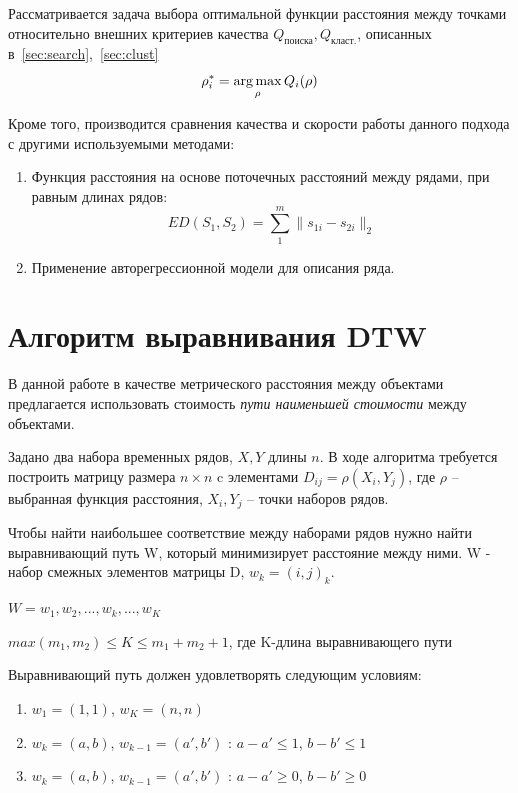 \documentclass[12pt,twoside]{article}
\begin{document}
        Рассматривается задача выбора оптимальной функции расстояния  между точками относительно внешних критериев качества $Q_\text{поиска}, Q_\text{класт.}$, описанных в~\ref{sec:search},~\ref{sec:clust}
        $$\rho_i^* = \argmax_\rho Q_i(\rho)$$
    
        
        Кроме того, производится сравнения качества и скорости работы данного подхода с другими используемыми методами:
        \begin{enumerate}[label=\arabic*)]
            \item Функция расстояния на основе поточечных расстояний между рядами, при равным длинах рядов:
                $$
                    ED(S_1, S_2) = \sum\limits_1^m \|s_{1i} - s_{2i}\|_2
                $$

            \item Применение авторегрессионной модели для описания ряда.
        \end{enumerate}
    
    \label{sec:dtw}\section{Алгоритм выравнивания DTW}

        В данной работе в качестве метрического расстояния между объектами предлагается использовать стоимость
        \textit{пути наименьшей стоимости} между объектами.
 
        Задано два набора временных рядов, $X, Y$ длины $n$.
        В ходе алгоритма требуется построить матрицу размера $n\times n$ c элементами $D_{ij}=\rho(X_i, Y_j)$, где $\rho$ -- выбранная функция расстояния, $X_i, Y_j$ -- точки наборов рядов.
        
        Чтобы найти наибольшее соответствие между наборами рядов нужно найти выравнивающий путь W, который минимизирует расстояние между ними.
        W - набор смежных элементов матрицы D, $w_k = (i, j)_k$.
            
            $W = w_1,w_2, ..., w_k, ..., w_K $

            $max(m_1, m_2)\leq K \leq m_1 + m_2 + 1$, где K-длина выравнивающего пути
            
        Выравнивающий путь должен удовлетворять следующим условиям:
            \begin{enumerate}[label=\arabic*)]
                \item $w_1=(1,1)$, $w_K=(n, n)$
                \item $w_k = (a, b)$, $w_{k-1}=(a', b')$ : $a-a' \leq 1$, $b-b' \leq 1$ 
                \item $w_k = (a, b)$, $w_{k-1}=(a', b')$ : $a-a' \geq 0$, $b-b'\geq 0$
            \end{enumerate}
\end{document}
